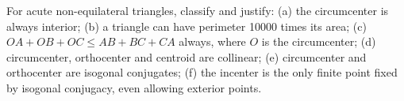 For acute non-equilateral triangles, classify and justify: (a) the circumcenter is always interior; (b) a triangle can have perimeter 10000 times its area; (c) $OA+OB+OC\le AB+BC+CA$ always, where $O$ is the circumcenter; (d) circumcenter, orthocenter and centroid are collinear; (e) circumcenter and orthocenter are isogonal conjugates; (f) the incenter is the only finite point fixed by isogonal conjugacy, even allowing exterior points.
